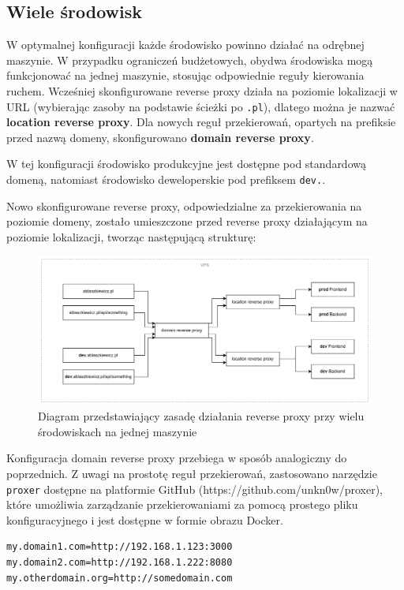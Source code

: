 \documentclass{article}
\begin{document}
\subsection{Wiele środowisk}

W optymalnej konfiguracji każde środowisko powinno działać na odrębnej maszynie. W przypadku ograniczeń budżetowych, obydwa środowiska mogą funkcjonować na jednej maszynie, stosując odpowiednie reguły kierowania ruchem. Wcześniej skonfigurowane reverse proxy działa na poziomie lokalizacji w URL (wybierając zasoby na podstawie ścieżki po \lstinline|.pl|), dlatego można je nazwać \textbf{location reverse proxy}. Dla nowych reguł przekierowań, opartych na prefiksie przed nazwą domeny, skonfigurowano \textbf{domain reverse proxy}.

W tej konfiguracji środowisko produkcyjne jest dostępne pod standardową domeną, natomiast środowisko deweloperskie pod prefiksem \lstinline|dev.|.

Nowo skonfigurowane reverse proxy, odpowiedzialne za przekierowania na poziomie domeny, zostało umieszczone przed reverse proxy działającym na poziomie lokalizacji, tworząc następującą strukturę:

\begin{figure}[H]
    \centering
    \includegraphics[width=1\linewidth]{domainReverseProxy.png}
    \caption{Diagram przedstawiający zasadę działania reverse proxy przy wielu środowiskach na jednej maszynie}
    \label{fig:enter-label}
\end{figure}

Konfiguracja domain reverse proxy przebiega w sposób analogiczny do poprzednich. Z uwagi na prostotę reguł przekierowań, zastosowano narzędzie \lstinline|proxer| dostępne na platformie GitHub (https://github.com/unkn0w/proxer), które umożliwia zarządzanie przekierowaniami za pomocą prostego pliku konfiguracyjnego i jest dostępne w formie obrazu Docker.

\begin{lstlisting}[caption=Plik \lstinline|/infrastructure/reverse-proxy/src/nxconf.sh|]
my.domain1.com=http://192.168.1.123:3000
my.domain2.com=http://192.168.1.222:8080
my.otherdomain.org=http://somedomain.com
\end{lstlisting}
\end{document}
